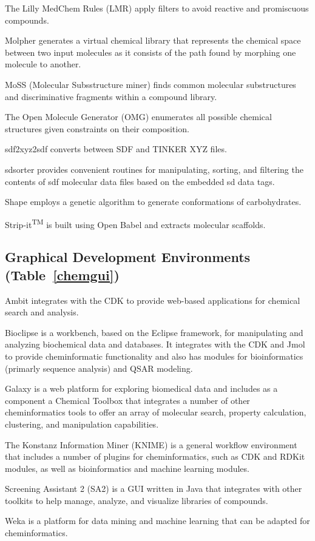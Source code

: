 The Lilly MedChem Rules (LMR)  \cite{Bruns_2012} apply filters to avoid reactive and promiscuous compounds.

Molpher  \cite{Hoksza_2014} generates a virtual chemical library that represents the chemical space between two input molecules as it consists of the path found by morphing one molecule to another.

MoSS (Molecular Subsstructure miner) \cite{Borgelt_2005} finds common molecular substructures and discriminative fragments within a compound library.

The Open Molecule Generator (OMG) \cite{Peironcely_2012} enumerates all possible chemical structures given constraints on their composition.

sdf2xyz2sdf  \cite{Tosco_2011} converts between SDF and TINKER XYZ files.

sdsorter provides convenient routines for manipulating, sorting, and filtering the contents of sdf molecular data files based on the embedded sd data tags.

Shape \cite{Rosen_2009} employs a genetic algorithm to generate conformations of carbohydrates.

Strip-it\textsuperscript{TM} is built using Open Babel and extracts molecular scaffolds. 


\subsection*{Graphical Development Environments (Table~\ref{chemgui})} 

Ambit \cite{Jeliazkova_2011} integrates with the CDK to provide web-based applications for chemical search and analysis.

Bioclipse  \cite{Spjuth_2009} is a workbench, based on the Eclipse framework, for manipulating and analyzing biochemical data and databases. It integrates with the CDK and Jmol to provide cheminformatic functionality and also has modules for bioinformatics (primarly sequence analysis) and QSAR modeling.

Galaxy \cite{Goecks_2010} is a web platform for exploring biomedical data and includes as a component a Chemical Toolbox that integrates a number of other cheminformatics tools to offer an array of molecular search, property calculation, clustering, and manipulation capabilities.

The Konstanz Information Miner (KNIME) is a general workflow environment that includes a number of plugins for cheminformatics, such as CDK \cite{Beisken_2013} and RDKit modules, as well as bioinformatics and machine learning modules.

Screening Assistant 2 (SA2) \cite{Guilloux_2012} is a GUI written in Java that integrates with other toolkits to help manage, analyze, and visualize libraries of compounds.

Weka \cite{Hall_2009} is a platform for data mining and machine learning that can be adapted for cheminformatics.  
